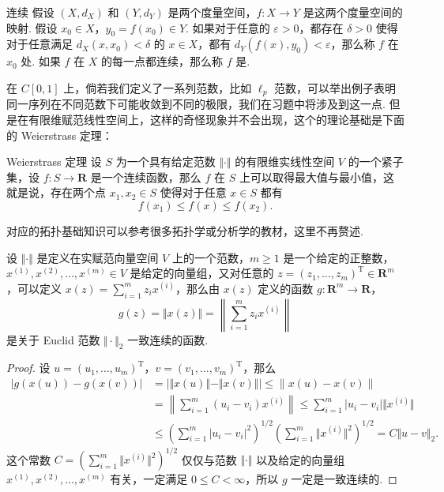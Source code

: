 \begin{definition}{连续}{}
    假设 $(X,d_X)$ 和 $(Y, d_Y)$ 是两个度量空间，$f\colon X\to Y$ 是这两个度量空间的映射. 假设 $x_0\in X$，$y_0 = f(x_0)\in Y$. 如果对于任意的 $\varepsilon>0$，都存在 $\delta>0$ 使得对于任意满足 $d_X(x, x_0) < \delta$ 的 $x\in X$，都有 $d_Y(f(x), y_0) < \varepsilon$，那么称 $f$ 在 $x_0$ 处. 如果 $f$ 在 $X$ 的每一点都连续，那么称 $f$ 是.
\end{definition}

在 $C[0, 1]$ 上，倘若我们定义了一系列范数，比如 $\ell_p$ 范数，可以举出例子表明同一序列在不同范数下可能收敛到不同的极限，我们在习题中将涉及到这一点. 但是在有限维赋范线性空间上，这样的奇怪现象并不会出现，这个的理论基础是下面的 Weierstrass 定理：

\begin{theorem}{Weierstrass 定理}{}
    设 $S$ 为一个具有给定范数 $\Vert \cdot \Vert$ 的有限维实线性空间 $V$ 的一个紧子集，设 $f\colon S\to\mathbf{R}$ 是一个连续函数，那么 $f$ 在 $S$ 上可以取得最大值与最小值，这就是说，存在两个点 $x_1, x_2\in S$ 使得对于任意 $x\in S$ 都有 \[f(x_1)\leqslant f(x)\leqslant f(x_2).\]
\end{theorem}

对应的拓扑基础知识可以参考很多拓扑学或分析学的教材，这里不再赘述.

\begin{lemma}{}{}
    设 $\Vert \cdot\Vert$ 是定义在实赋范向量空间 $V$ 上的一个范数，$m\geqslant 1$ 是一个给定的正整数，$x^{(1)}, x^{(2)}, \ldots, x^{(m)}\in V$ 是给定的向量组，又对任意的 $z = (z_1, \ldots, z_m)^\mathrm{T} \in \mathbf{R}^m$，可以定义 $x(z) = \sum\limits_{i=1}^{m}z_ix^{(i)}$，那么由 $x(z)$ 定义的函数 $g\colon \mathbf{R}^m\to \mathbf{R}$，
    \[g(z) = \Vert x(z)\Vert = \left\lVert \sum_{i=1}^{m}z_ix^{(i)}\right\rVert\] 是关于 Euclid 范数 $\Vert\cdot\Vert_2$ 一致连续的函数.
\end{lemma}

\begin{proof}
    设 $u = (u_1, \ldots, u_m)^\mathrm{T}$，$v = (v_1, \ldots, v_m)^\mathrm{T}$，那么
    \[\begin{aligned}
            \vert g(x(u)) - g(x(v))\vert
             & = \lvert \Vert x(u) \Vert - \Vert x(v) \Vert \rvert \leqslant \lVert x(u) - x(v)\rVert                                                           \\
             & = \left\lVert \sum_{i = 1}^{m} (u_i - v_i)x^{(i)}\right\rVert \leqslant \sum_{i = 1}^{m}\vert u_i - v_i\vert \Vert x^{(i)}\Vert                             \\
             & \leqslant \left(\sum_{i = 1}^{m}\vert u_i - v_i\vert^2\right)^{1/2}\left(\sum_{i = 1}^{m}\Vert x^{(i)}\Vert^2\right)^{1/2} =C\Vert u - v\Vert_2.
        \end{aligned}\]
    这个常数 $C = \left(\sum\limits_{i = 1}^{m}\Vert x^{(i)}\Vert^2\right)^{1/2}$ 仅仅与范数 $\Vert\cdot\Vert$ 以及给定的向量组 $x^{(1)}, x^{(2)}, \ldots, x^{(m)}$ 有关，一定满足 $0 \leqslant C<\infty$，所以 $g$ 一定是一致连续的.
\end{proof}


